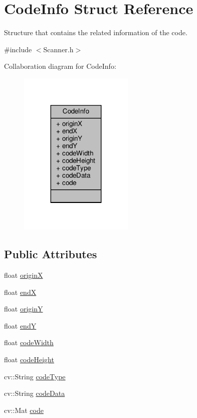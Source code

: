 \hypertarget{struct_code_info}{}\section{Code\+Info Struct Reference}
\label{struct_code_info}


Structure that contains the related information of the code.  




{\ttfamily \#include $<$Scanner.\+h$>$}



Collaboration diagram for Code\+Info\+:\nopagebreak
\begin{figure}[H]
\begin{center}
\leavevmode
\includegraphics[width=155pt]{struct_code_info__coll__graph}
\end{center}
\end{figure}
\subsection*{Public Attributes}
\begin{DoxyCompactItemize}
\item 
float \hyperlink{struct_code_info_aaf7a04108a44c795809b1c0322f53a9b}{originX}
\item 
float \hyperlink{struct_code_info_afcbf3d398415769aba6f875c29395ec7}{endX}
\item 
float \hyperlink{struct_code_info_aa4dab88d16276786b4556f021fd192f7}{originY}
\item 
float \hyperlink{struct_code_info_a8d3d91e8e32d9294b514950029755841}{endY}
\item 
float \hyperlink{struct_code_info_ab8493ec1c1f670d1060bde6c261f9e80}{code\+Width}
\item 
float \hyperlink{struct_code_info_a8035a0d0891b25d59693e23f192e3a29}{code\+Height}
\item 
cv\+::\+String \hyperlink{struct_code_info_aa93c41fefb9505ee55963d60ec1299e7}{code\+Type}
\item 
cv\+::\+String \hyperlink{struct_code_info_a01341cc7b99f93fbdd052f6d3e5b1e20}{code\+Data}
\item 
cv\+::\+Mat \hyperlink{struct_code_info_aeaec8d442ba7cf5b8a946f3da849ebfe}{code}
\end{DoxyCompactItemize}


